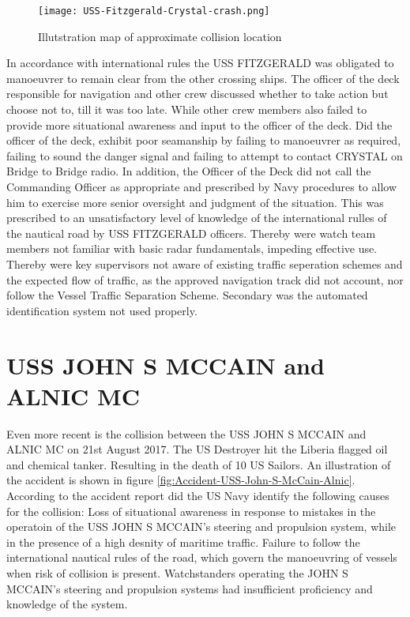 \begin{figure}[H]
	\centering
	\texttt{[image: USS-Fitzgerald-Crystal-crash.png]}
	\caption{Illutstration map of approximate collision location}
	\label{fig:Accident-USS-Fitzgerald-Crystal}
\end{figure}

In accordance with international rules the USS FITZGERALD was obligated to manoeuvrer to remain clear from the other crossing ships. The officer of the deck responsible for navigation and other crew discussed whether to take action but choose not to, till it was too late. While other crew members also failed to provide more situational awareness and input to the officer of the deck. Did the officer of the deck, exhibit poor seamanship by failing to manoeuvrer as required, failing to sound the danger signal and failing to attempt to contact CRYSTAL on Bridge to Bridge radio. In addition, the Officer of the Deck did not call the Commanding Officer as appropriate and prescribed by Navy procedures to allow him to exercise more senior oversight and judgment of the situation. This was prescribed to an unsatisfactory level of knowledge of the international rulles of the nautical road by USS FITZGERALD officers. Thereby were watch team members not familiar with basic radar fundamentals, impeding effective use. Thereby were key supervisors not aware of existing traffic seperation schemes and the expected flow of traffic, as the approved navigation track did not account, nor follow the Vessel Traffic Separation Scheme. Secondary was the automated identification system not used properly. \cite{USSNavy2017}

\newpage
\section{USS JOHN S MCCAIN and ALNIC MC}
Even more recent is the collision between the USS JOHN S MCCAIN and ALNIC MC on 21st August 2017. The US Destroyer hit the Liberia flagged oil and chemical tanker. Resulting in the death of 10  US Sailors. An illustration of the accident is shown in figure \ref{fig:Accident-USS-John-S-McCain-Alnic}. According to the accident report did the US Navy identify the following causes for the collision: Loss of situational awareness in response to mistakes in the operatoin of the USS JOHN S MCCAIN's steering and propulsion system, while in the presence of a high desnity of maritime traffic. Failure to follow the international nautical rules of the road, which govern the manoeuvring of vessels when risk of collision is present. Watchstanders operating the JOHN S MCCAIN's steering and propulsion systems had insufficient proficiency and knowledge of the system. 

